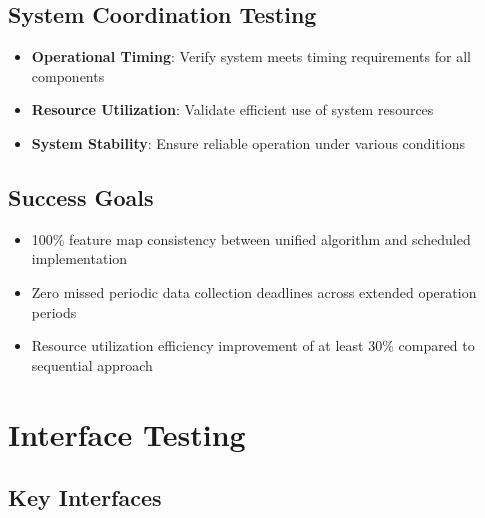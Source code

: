 \subsection{System Coordination Testing}\label{subsec:system-coordination-testing}

\begin{itemize}
\item \textbf{Operational Timing}: Verify system meets timing requirements for all components
\item \textbf{Resource Utilization}: Validate efficient use of system resources
\item \textbf{System Stability}: Ensure reliable operation under various conditions
\end{itemize}

\subsection{Success Goals}\label{subsec:success-goals}

\begin{itemize}
\item 100\% feature map consistency between unified algorithm and scheduled implementation
\item Zero missed periodic data collection deadlines across extended operation periods
\item Resource utilization efficiency improvement of at least 30\% compared to sequential approach
\end{itemize}

\section{Interface Testing}\label{sec:interface-testing}

\subsection{Key Interfaces}\label{subsec:key-interfaces}

